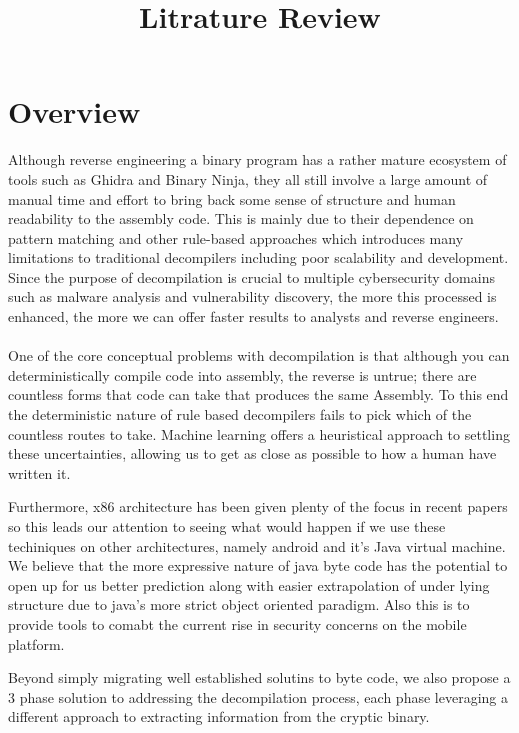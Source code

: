 \documentclass{article}
\author{}
\title{Litrature Review}
\begin{document}
	\maketitle

\section{Overview}
Although reverse engineering a binary program has a rather mature ecosystem of tools such as Ghidra and Binary Ninja, they all still involve a large amount of manual time and effort to bring back some sense of structure and human readability to the assembly code.
This is mainly due to their dependence on pattern matching and other rule-based approaches which introduces many limitations to traditional decompilers including poor scalability and development.
Since the purpose of decompilation is crucial to multiple cybersecurity domains such as malware analysis and vulnerability discovery, the more this processed is enhanced, the more we can offer faster results to analysts and reverse engineers. \\\\

One of the core conceptual problems with decompilation is that although you can deterministically compile code into assembly, the reverse is untrue; there are countless forms that code can take that produces the same Assembly.
To this end the deterministic nature of rule based decompilers fails to pick which of the countless routes to take.
Machine learning offers a heuristical approach to settling these uncertainties, allowing us to get as close as possible to how a human have written it.

Furthermore, x86 architecture has been given plenty of the focus in recent papers so this leads our attention to seeing what would happen if we use these techiniques on other architectures, namely android and it's Java virtual machine.
We believe that the more expressive nature of java byte code has the potential to open up for us better prediction along with easier extrapolation of under lying structure due to java's more strict object oriented paradigm.
Also this is to provide tools to comabt the current rise in security concerns on the mobile platform.

Beyond simply migrating well established solutins to byte code, we also propose a 3 phase solution to addressing the decompilation process, each phase leveraging a different approach to extracting information from the cryptic binary.
\end{document}
